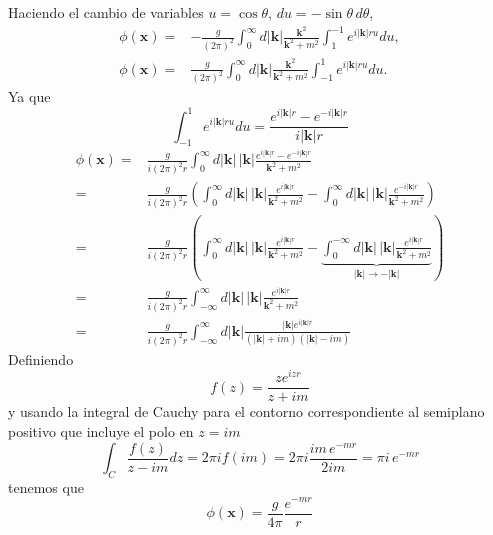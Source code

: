 Haciendo el cambio de variables $u=\cos\theta$, $du=-\sin\theta\,d\theta$,
\begin{align}
  \phi(\mathbf{x})=&-\frac{g}{(2\pi)^2}\int_0^\infty d|\mathbf{k}|
    \frac{\mathbf{k}^2}{\mathbf{k}^2+m^2}\int_{1}^{-1}e^{i|\mathbf{k}|ru}du,\nonumber\\
  \phi(\mathbf{x})=&\frac{g}{(2\pi)^2}\int_0^\infty d|\mathbf{k}|
    \frac{\mathbf{k}^2}{\mathbf{k}^2+m^2}\int_{-1}^1e^{i|\mathbf{k}|ru}du.
\end{align}
Ya que  
\begin{equation*}
  \int_{-1}^1e^{i|\mathbf{k}|ru}du=\frac{e^{i|\mathbf{k}|r}-e^{-i|\mathbf{k}|r}}{i|\mathbf{k}|r}
\end{equation*}
\begin{align}
  \phi(\mathbf{x})=&\frac{g}{i(2\pi)^2r}\int_0^\infty d|\mathbf{k}|\,|\mathbf{k}|
    \frac{e^{i|\mathbf{k}|r}-e^{-i|\mathbf{k}|r}}{\mathbf{k}^2+m^2}\nonumber\\
    =&\frac{g}{i(2\pi)^2r}\left(\int_0^\infty d|\mathbf{k}|\,|\mathbf{k}|
\frac{e^{i|\mathbf{k}|r}}{\mathbf{k}^2+m^2}-\int_0^\infty d|\mathbf{k}|\,|\mathbf{k}|
\frac{e^{-i|\mathbf{k}|r}}{\mathbf{k}^2+m^2}\right)\nonumber\\
=&\frac{g}{i(2\pi)^2r}\left(\int_0^\infty d|\mathbf{k}|\,|\mathbf{k}|
\frac{e^{i|\mathbf{k}|r}}{\mathbf{k}^2+m^2}-\underbrace{\int_0^{-\infty}d|\mathbf{k}|\,|\mathbf{k}|
\frac{e^{i|\mathbf{k}|r}}{\mathbf{k}^2+m^2}}_{|\mathbf{k}|\to-|\mathbf{k}|}\right)\nonumber\\
=&\frac{g}{i(2\pi)^2r}\int_{-\infty}^\infty d|\mathbf{k}|\,|\mathbf{k}|
\frac{e^{i|\mathbf{k}|r}}{\mathbf{k}^2+m^2}\nonumber\\
\label{eq:37}
    =&\frac{g}{i(2\pi)^2r}\int_{-\infty}^\infty d|\mathbf{k}|
    \frac{|\mathbf{k}|e^{i|\mathbf{k}|r}}{(|\mathbf{k}|+im)(|\mathbf{k}|-im)}
\end{align}
Definiendo
\begin{equation*}
  f(z)=\frac{ze^{izr}}{z+im}
\end{equation*}
y usando la integral de Cauchy para el contorno correspondiente al semiplano positivo que incluye el polo en $z=im$
\begin{equation}
  \int_C\frac{f(z)}{z-im}dz=2\pi if(im)=2\pi i\frac{im\,e^{-mr}}{2im}=\pi i\,e^{-mr}
\end{equation}
tenemos que
\begin{equation}
 \label{eq:38}
  \phi(\mathbf{x})=\frac{g}{4\pi}\frac{e^{-mr}}{r}
\end{equation}

